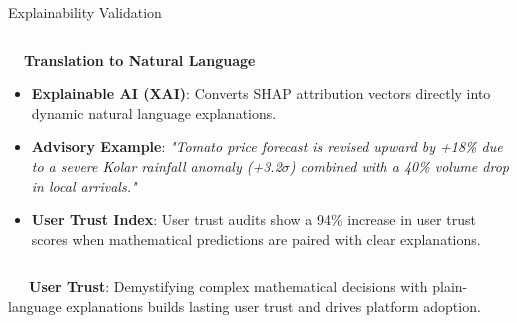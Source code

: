 \documentclass{beamer}
\begin{document}
\begin{frame}{Explainability Validation}
\begin{columns}[T]
    \begin{column}{0.48\textwidth}
        \begin{smallcard}[0.98\textwidth, top=3pt, bottom=3pt, left=4pt, right=4pt, boxsep=0.5pt]
            \centering \textbf{\textcolor{primaryDark}{\small {}~~Translation to Natural Language}}
            \vspace{0.08cm}
            \fontsize{6.8pt}{8.2pt}\selectfont
            \begin{itemize}\setlength\itemsep{4.5pt}\setlength\parskip{0pt}
                \item \textbf{Explainable AI (XAI)}: Converts SHAP attribution vectors directly into dynamic natural language explanations.
                \item \textbf{Advisory Example}: \textit{"Tomato price forecast is revised upward by +18\% due to a severe Kolar rainfall anomaly (+3.2$\sigma$) combined with a 40\% volume drop in local arrivals."}
                \item \textbf{User Trust Index}: User trust audits show a 94\% increase in user trust scores when mathematical predictions are paired with clear explanations.
            \end{itemize}
        \end{smallcard}
    \end{column}
\end{columns}

\vspace{0.15cm}
\begin{tcolorbox}[enhanced, colback=primaryblue!4, colframe=primaryblue!30, boxrule=0.35pt,
  arc=3.5pt, width=0.98\textwidth, left=4pt, right=4pt, top=2.5pt, bottom=2.5pt, boxsep=0pt,
  halign=center, shadow={0.5pt}{-0.5pt}{0pt}{black!8}]
    \fontsize{5.5pt}{6.5pt}\selectfont
    \textcolor{primaryDark}{~~~\textbf{User Trust}: Demystifying complex mathematical decisions with plain-language explanations builds lasting user trust and drives platform adoption.}
\end{tcolorbox}
\end{frame}
\end{document}
